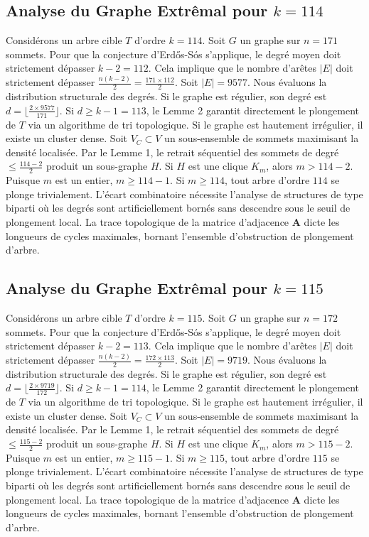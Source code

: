 \documentclass[11pt,a4paper]{article}
\begin{document}
\subsection{Analyse du Graphe Extr\^emal pour $k=114$}
Consid\'erons un arbre cible $T$ d'ordre $k=114$.
Soit $G$ un graphe sur $n=171$ sommets.
Pour que la conjecture d'Erd\H{o}s-S\'os s'applique, le degr\'e moyen doit strictement d\'epasser $k-2 = 112$.
Cela implique que le nombre d'ar\^etes $|E|$ doit strictement d\'epasser $\frac{n(k-2)}{2} = \frac{171 \times 112}{2}$.
Soit $|E| = 9577$.
Nous \'evaluons la distribution structurale des degr\'es. Si le graphe est r\'egulier, son degr\'e est $d = \lfloor \frac{2 \times 9577}{171} \rfloor$.
Si $d \geq k-1 = 113$, le Lemme 2 garantit directement le plongement de $T$ via un algorithme de tri topologique.
Si le graphe est hautement irr\'egulier, il existe un cluster dense. Soit $V_C \subset V$ un sous-ensemble de sommets maximisant la densit\'e localis\'ee.
Par le Lemme 1, le retrait s\'equentiel des sommets de degr\'e $\leq \frac{114-2}{2}$ produit un sous-graphe $H$.
Si $H$ est une clique $K_{m}$, alors $m > 114-2$. Puisque $m$ est un entier, $m \geq 114-1$. Si $m \geq 114$, tout arbre d'ordre $114$ se plonge trivialement.
L'\'ecart combinatoire n\'ecessite l'analyse de structures de type biparti o\`u les degr\'es sont artificiellement born\'es sans descendre sous le seuil de plongement local. La trace topologique de la matrice d'adjacence $\mathbf{A}$ dicte les longueurs de cycles maximales, bornant l'ensemble d'obstruction de plongement d'arbre.


\subsection{Analyse du Graphe Extr\^emal pour $k=115$}
Consid\'erons un arbre cible $T$ d'ordre $k=115$.
Soit $G$ un graphe sur $n=172$ sommets.
Pour que la conjecture d'Erd\H{o}s-S\'os s'applique, le degr\'e moyen doit strictement d\'epasser $k-2 = 113$.
Cela implique que le nombre d'ar\^etes $|E|$ doit strictement d\'epasser $\frac{n(k-2)}{2} = \frac{172 \times 113}{2}$.
Soit $|E| = 9719$.
Nous \'evaluons la distribution structurale des degr\'es. Si le graphe est r\'egulier, son degr\'e est $d = \lfloor \frac{2 \times 9719}{172} \rfloor$.
Si $d \geq k-1 = 114$, le Lemme 2 garantit directement le plongement de $T$ via un algorithme de tri topologique.
Si le graphe est hautement irr\'egulier, il existe un cluster dense. Soit $V_C \subset V$ un sous-ensemble de sommets maximisant la densit\'e localis\'ee.
Par le Lemme 1, le retrait s\'equentiel des sommets de degr\'e $\leq \frac{115-2}{2}$ produit un sous-graphe $H$.
Si $H$ est une clique $K_{m}$, alors $m > 115-2$. Puisque $m$ est un entier, $m \geq 115-1$. Si $m \geq 115$, tout arbre d'ordre $115$ se plonge trivialement.
L'\'ecart combinatoire n\'ecessite l'analyse de structures de type biparti o\`u les degr\'es sont artificiellement born\'es sans descendre sous le seuil de plongement local. La trace topologique de la matrice d'adjacence $\mathbf{A}$ dicte les longueurs de cycles maximales, bornant l'ensemble d'obstruction de plongement d'arbre.
\end{document}
